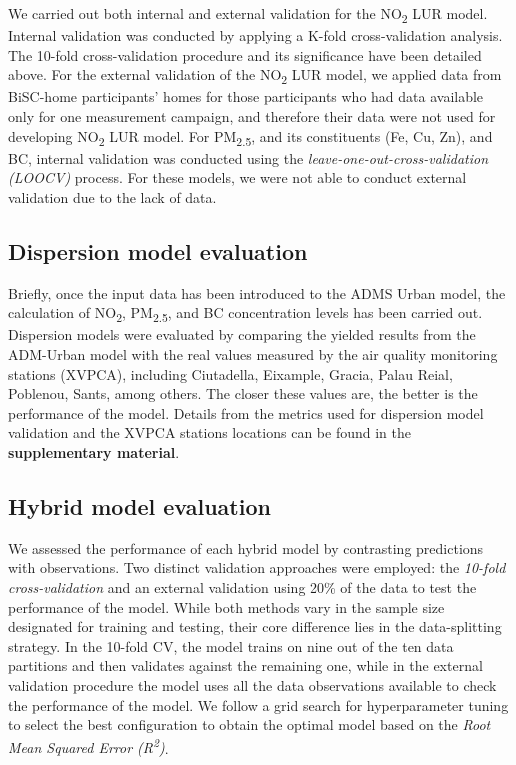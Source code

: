 \documentclass{article}
\begin{document}
We carried out both internal and external validation for the NO\textsubscript{2} LUR model. Internal validation was conducted by applying a K-fold cross-validation analysis. The 10-fold cross-validation procedure and its significance have been detailed above. For the external validation of the NO\textsubscript{2} LUR model, we applied data from BiSC-home participants' homes for those participants who had data available only for one measurement campaign, and therefore their data were not used for developing NO\textsubscript{2} LUR model. For PM\textsubscript{2.5}, and its constituents (Fe, Cu, Zn), and BC, internal validation was conducted using the \textit{leave-one-out-cross-validation (LOOCV)} process. For these models, we were not able to conduct external validation due to the lack of data.

\subsection{Dispersion model evaluation}
 Briefly, once the input data has been introduced to the ADMS Urban model, the calculation of NO\textsubscript{2}, PM\textsubscript{2.5}, and BC concentration levels has been carried out. Dispersion models were evaluated by comparing the yielded results from the ADM-Urban model with the real values measured by the air quality monitoring stations (XVPCA), including Ciutadella, Eixample, Gracia, Palau Reial, Poblenou, Sants, among others. The closer these values are, the better is the performance of the model.  Details from the metrics used for dispersion model validation and the XVPCA stations locations can be found in the \textbf{supplementary material}.\vspace{0.5cm}

\subsection{Hybrid model evaluation}
We assessed the performance of each hybrid model by contrasting predictions with observations. Two distinct validation approaches were employed: the \textit{10-fold cross-validation} and an external validation using 20\% of the data to test the performance of the model. While both methods vary in the sample size designated for training and testing, their core difference lies in the data-splitting strategy. In the 10-fold CV, the model trains on nine out of the ten data partitions and then validates against the remaining one, while in the external validation procedure the model uses all the data observations available to check the performance of the model.
We follow a grid search for hyperparameter tuning  to select the best configuration to obtain the optimal model based on the \textit{Root Mean Squared Error (R\textsuperscript{2})}. 
\end{document}
